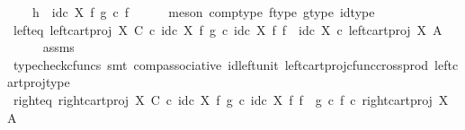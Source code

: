 \begin{isabellebody}
\ \ \ \ h\ {\isacharequal}{\kern0pt}\ id\isactrlsub c\ X\ {\isasymtimes}\isactrlsub f\ {\isacharparenleft}{\kern0pt}g\ {\isasymcirc}\isactrlsub c\ f{\isacharparenright}{\kern0pt}{\isachardoublequoteclose}\isanewline
\ \ \ \ \isamarkupfalse%
\ {\isacharparenleft}{\kern0pt}meson\ comp{\isacharunderscore}{\kern0pt}type\ f{\isacharunderscore}{\kern0pt}type\ g{\isacharunderscore}{\kern0pt}type\ id{\isacharunderscore}{\kern0pt}type{\isacharparenright}{\kern0pt}\isanewline
\isanewline
\ \ \isamarkupfalse%
\ left{\isacharunderscore}{\kern0pt}eq{\isacharcolon}{\kern0pt}\ {\isachardoublequoteopen}left{\isacharunderscore}{\kern0pt}cart{\isacharunderscore}{\kern0pt}proj\ X\ C\ {\isasymcirc}\isactrlsub c\ {\isacharparenleft}{\kern0pt}id\isactrlsub c\ X\ {\isasymtimes}\isactrlsub f\ g{\isacharparenright}{\kern0pt}\ {\isasymcirc}\isactrlsub c\ {\isacharparenleft}{\kern0pt}id\isactrlsub c\ X\ {\isasymtimes}\isactrlsub f\ f{\isacharparenright}{\kern0pt}\ {\isacharequal}{\kern0pt}\ id\isactrlsub c\ X\ {\isasymcirc}\isactrlsub c\ left{\isacharunderscore}{\kern0pt}cart{\isacharunderscore}{\kern0pt}proj\ X\ A{\isachardoublequoteclose}\isanewline
\ \ \ \ \isamarkupfalse%
\ assms\ \isamarkupfalse%
\ {\isacharparenleft}{\kern0pt}typecheck{\isacharunderscore}{\kern0pt}cfuncs{\isacharcomma}{\kern0pt}\ smt\ comp{\isacharunderscore}{\kern0pt}associative{}\ id{\isacharunderscore}{\kern0pt}left{\isacharunderscore}{\kern0pt}unit{}\ left{\isacharunderscore}{\kern0pt}cart{\isacharunderscore}{\kern0pt}proj{\isacharunderscore}{\kern0pt}cfunc{\isacharunderscore}{\kern0pt}cross{\isacharunderscore}{\kern0pt}prod\ left{\isacharunderscore}{\kern0pt}cart{\isacharunderscore}{\kern0pt}proj{\isacharunderscore}{\kern0pt}type{\isacharparenright}{\kern0pt}\isanewline
\ \ \isamarkupfalse%
\ right{\isacharunderscore}{\kern0pt}eq{\isacharcolon}{\kern0pt}\ {\isachardoublequoteopen}right{\isacharunderscore}{\kern0pt}cart{\isacharunderscore}{\kern0pt}proj\ X\ C\ {\isasymcirc}\isactrlsub c\ {\isacharparenleft}{\kern0pt}id\isactrlsub c\ X\ {\isasymtimes}\isactrlsub f\ g{\isacharparenright}{\kern0pt}\ {\isasymcirc}\isactrlsub c\ {\isacharparenleft}{\kern0pt}id\isactrlsub c\ X\ {\isasymtimes}\isactrlsub f\ f{\isacharparenright}{\kern0pt}\ {\isacharequal}{\kern0pt}\ {\isacharparenleft}{\kern0pt}g\ {\isasymcirc}\isactrlsub c\ f{\isacharparenright}{\kern0pt}\ {\isasymcirc}\isactrlsub c\ right{\isacharunderscore}{\kern0pt}cart{\isacharunderscore}{\kern0pt}proj\ X\ A{\isachardoublequoteclose}\isanewline
\ \ \ \ \isamarkupfalse%

\end{isabellebody}
